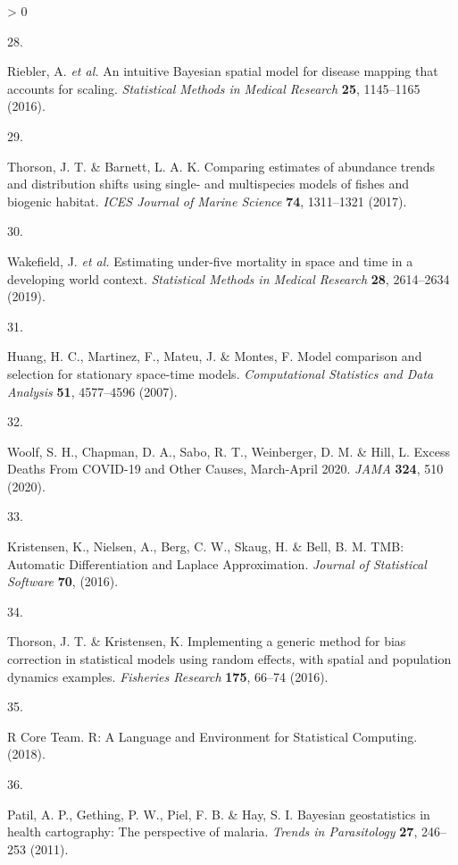 \documentclass[
]{article}
\newlength{\cslhangindent}
\newlength{\csllabelwidth}
\newenvironment{CSLReferences}[2] %
 {%
  \setlength{\parindent}{0pt}
  \ifodd #1 \everypar{\setlength{\hangindent}{\cslhangindent}}\ignorespaces\fi
  \ifnum #2 > 0
  \setlength{\parskip}{#2\baselineskip}
  \fi
 }%
 {}
\newcommand{\CSLLeftMargin}[1]{\parbox[t]{\csllabelwidth}{#1}}
\newcommand{\CSLRightInline}[1]{\parbox[t]{\linewidth - \csllabelwidth}{#1}\break}
\begin{document}
\begin{CSLReferences}{0}{0}
\leavevmode\hypertarget{ref-Riebler2016}{}%
\CSLLeftMargin{28. }
\CSLRightInline{Riebler, A. \emph{et al.} {An intuitive Bayesian spatial model for disease mapping that accounts for scaling}. \emph{Statistical Methods in Medical Research} \textbf{25}, 1145--1165 (2016).}

\leavevmode\hypertarget{ref-Thorson2017}{}%
\CSLLeftMargin{29. }
\CSLRightInline{Thorson, J. T. \& Barnett, L. A. K. {Comparing estimates of abundance trends and distribution shifts using single- and multispecies models of fishes and biogenic habitat}. \emph{ICES Journal of Marine Science} \textbf{74}, 1311--1321 (2017).}

\leavevmode\hypertarget{ref-Wakefield2019}{}%
\CSLLeftMargin{30. }
\CSLRightInline{Wakefield, J. \emph{et al.} {Estimating under-five mortality in space and time in a developing world context}. \emph{Statistical Methods in Medical Research} \textbf{28}, 2614--2634 (2019).}

\leavevmode\hypertarget{ref-Huang2007}{}%
\CSLLeftMargin{31. }
\CSLRightInline{Huang, H. C., Martinez, F., Mateu, J. \& Montes, F. {Model comparison and selection for stationary space-time models}. \emph{Computational Statistics and Data Analysis} \textbf{51}, 4577--4596 (2007).}

\leavevmode\hypertarget{ref-Woolf2020}{}%
\CSLLeftMargin{32. }
\CSLRightInline{Woolf, S. H., Chapman, D. A., Sabo, R. T., Weinberger, D. M. \& Hill, L. {Excess Deaths From COVID-19 and Other Causes, March-April 2020}. \emph{JAMA} \textbf{324}, 510 (2020).}

\leavevmode\hypertarget{ref-Kristensen2016}{}%
\CSLLeftMargin{33. }
\CSLRightInline{Kristensen, K., Nielsen, A., Berg, C. W., Skaug, H. \& Bell, B. M. {TMB: Automatic Differentiation and Laplace Approximation}. \emph{Journal of Statistical Software} \textbf{70}, (2016).}

\leavevmode\hypertarget{ref-Thorson2016}{}%
\CSLLeftMargin{34. }
\CSLRightInline{Thorson, J. T. \& Kristensen, K. {Implementing a generic method for bias correction in statistical models using random effects, with spatial and population dynamics examples}. \emph{Fisheries Research} \textbf{175}, 66--74 (2016).}

\leavevmode\hypertarget{ref-RCoreTeam2018}{}%
\CSLLeftMargin{35. }
\CSLRightInline{R Core Team. {R: A Language and Environment for Statistical Computing}. (2018).}

\leavevmode\hypertarget{ref-Patil2011}{}%
\CSLLeftMargin{36. }
\CSLRightInline{Patil, A. P., Gething, P. W., Piel, F. B. \& Hay, S. I. {Bayesian geostatistics in health cartography: The perspective of malaria}. \emph{Trends in Parasitology} \textbf{27}, 246--253 (2011).}


\end{CSLReferences}
\end{document}
